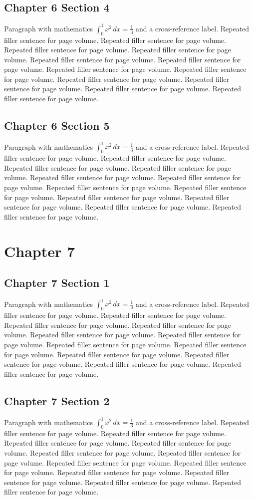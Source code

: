 \documentclass[11pt]{report}
\begin{document}
\section{Chapter 6 Section 4}
Paragraph with mathematics $\int_0^1 x^2\,dx = \frac13$ and a cross-reference label.
\label{sec:6:4}
Repeated filler sentence for page volume. Repeated filler sentence for page volume. Repeated filler sentence for page volume. Repeated filler sentence for page volume. Repeated filler sentence for page volume. Repeated filler sentence for page volume. Repeated filler sentence for page volume. Repeated filler sentence for page volume. Repeated filler sentence for page volume. Repeated filler sentence for page volume. Repeated filler sentence for page volume. Repeated filler sentence for page volume. 
\section{Chapter 6 Section 5}
Paragraph with mathematics $\int_0^1 x^2\,dx = \frac13$ and a cross-reference label.
\label{sec:6:5}
Repeated filler sentence for page volume. Repeated filler sentence for page volume. Repeated filler sentence for page volume. Repeated filler sentence for page volume. Repeated filler sentence for page volume. Repeated filler sentence for page volume. Repeated filler sentence for page volume. Repeated filler sentence for page volume. Repeated filler sentence for page volume. Repeated filler sentence for page volume. Repeated filler sentence for page volume. Repeated filler sentence for page volume. 
\chapter{Chapter 7}
\section{Chapter 7 Section 1}
Paragraph with mathematics $\int_0^1 x^2\,dx = \frac13$ and a cross-reference label.
\label{sec:7:1}
Repeated filler sentence for page volume. Repeated filler sentence for page volume. Repeated filler sentence for page volume. Repeated filler sentence for page volume. Repeated filler sentence for page volume. Repeated filler sentence for page volume. Repeated filler sentence for page volume. Repeated filler sentence for page volume. Repeated filler sentence for page volume. Repeated filler sentence for page volume. Repeated filler sentence for page volume. Repeated filler sentence for page volume. 
\section{Chapter 7 Section 2}
Paragraph with mathematics $\int_0^1 x^2\,dx = \frac13$ and a cross-reference label.
\label{sec:7:2}
Repeated filler sentence for page volume. Repeated filler sentence for page volume. Repeated filler sentence for page volume. Repeated filler sentence for page volume. Repeated filler sentence for page volume. Repeated filler sentence for page volume. Repeated filler sentence for page volume. Repeated filler sentence for page volume. Repeated filler sentence for page volume. Repeated filler sentence for page volume. Repeated filler sentence for page volume. Repeated filler sentence for page volume. 
\end{document}

